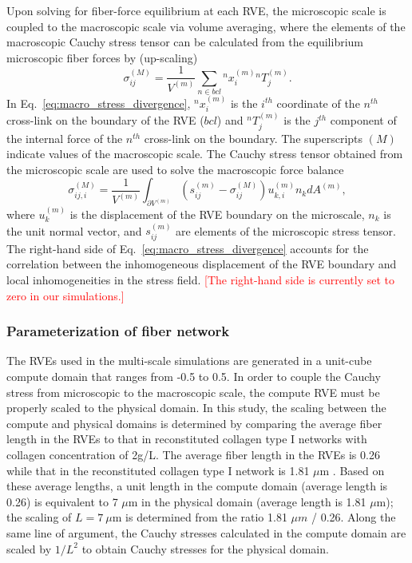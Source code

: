 \documentclass[10pt]{asme2ej}
\begin{document}
Upon solving for fiber-force equilibrium at each RVE, the microscopic scale is coupled to the macroscopic scale via volume averaging, where the elements of the macroscopic Cauchy stress tensor can be calculated from the equilibrium microscopic fiber forces by (up-scaling)\cite{Chandran:2007hy,Stylianopoulos:2007dp}
%
\begin{equation}
\sigma_{ij}^{(M)} = \frac{1}{V^{(m)}} \sum_{n \in bcl} {}^n x_i^{(m)} {}^n T_j^{(m)}.
\label{eq:macro_stress_discrete}
\end{equation}
%
In Eq.\ \eqref{eq:macro_stress_divergence}, ${}^nx_i^{(m)}$ is the $i^{th}$ coordinate of the $n^{th}$ cross-link on the boundary of the RVE ($bcl$) and ${}^nT_j^{(m)}$ is the $j^{th}$ component of the internal force of the $n^{th}$ cross-link on the boundary. The superscripts $(M)$ indicate values of the macroscopic scale. The Cauchy stress tensor obtained from the microscopic scale are used to solve the macroscopic force balance \cite{Chandran:2007hy,Stylianopoulos:2007dp}
%
\begin{equation}
\sigma_{ij,i}^{(M)} = \frac{1}{V^{(m)}} \int_{\partial V^{(m)}} \left( s_{ij}^{(m)} - \sigma_{ij}^{(M)} \right)u_{k,i}^{(m)} n_k dA^{(m)},
\label{eq:macro_stress_divergence}
\end{equation}
%
where $u_k^{(m)}$ is the displacement of the RVE boundary on the microscale, $n_k$ is the unit normal vector, and $s_{ij}^{(m)}$ are elements of the microscopic stress tensor. The right-hand side of Eq.\ \eqref{eq:macro_stress_divergence} accounts for the correlation between the inhomogeneous displacement of the RVE boundary and local inhomogeneities in the stress field. \textcolor{red}{[The right-hand side is currently set to zero in our simulations.]}

\subsubsection{Parameterization of fiber network}
The RVEs used in the multi-scale simulations are generated in a unit-cube compute domain that ranges from -0.5 to 0.5. In order to couple the Cauchy stress from microscopic to the macroscopic scale, the compute RVE must be properly scaled to the physical domain. In this study, the scaling between the compute and physical domains is determined by comparing the average fiber length in the RVEs to that in reconstituted collagen type I networks \cite{Lindstrom:2013gd} with collagen concentration of 2g/L. The average fiber length in the RVEs is 0.26 while that in the reconstituted collagen type I network is 1.81 $\mu$m \cite{Lindstrom:2013gd}. Based on these average lengths, a unit length in the compute  domain (average length is 0.26) is equivalent to 7 $\mu$m in the physical domain (average length is 1.81 $\mu$m); the scaling of $L=7 \ \mu$m is determined from the ratio 1.81 $\mu m$ / 0.26. Along the same line of argument, the Cauchy stresses calculated in the compute domain are scaled by $1/L^2$ to obtain Cauchy stresses for the physical domain.
\end{document}
